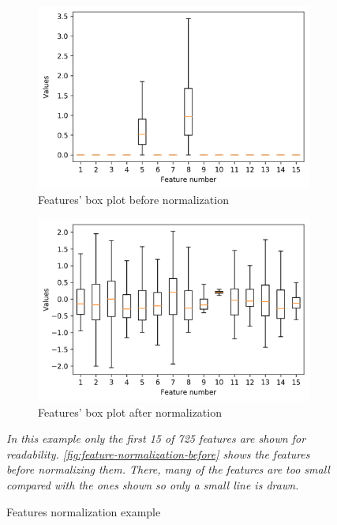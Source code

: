 \begin{figure}
  \centering

  \begin{subfigure}[t]{.49\textwidth}
    \includegraphics[width=\textwidth]{images/features_original}

    \caption{Features' box plot before normalization \label{fig:feature-normalization-before}}
  \end{subfigure}
  \hfill
  \begin{subfigure}[t]{.49\textwidth}
    \includegraphics[width=\textwidth]{images/features_normalized}

    \caption{Features' box plot after normalization}
  \end{subfigure}

  \caption{Features normalization example \label{fig:feature-normalization}}

  \itshape\justify
  In this example only the first 15 of 725 features are shown for readability. 
  \autoref{fig:feature-normalization-before} shows the features before normalizing them. 
  There, many of the features are too small compared with the ones shown so only a small 
  line is drawn.
  
\end{figure}



